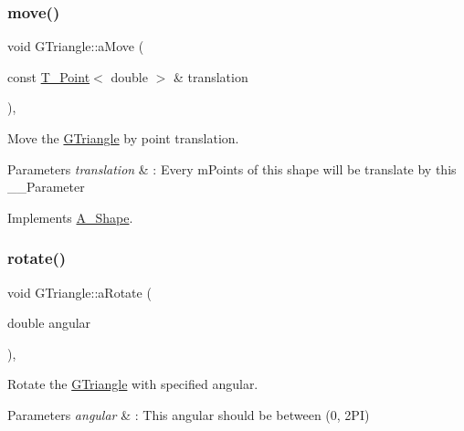 \mbox{\label{classGTriangle_a6675f3448fca16c1afec576145a9b139}} 
\subsubsection{\texorpdfstring{move()}{move()}}
{\footnotesize\ttfamily void G\+Triangle\+::aMove (\begin{DoxyParamCaption}\item[{const \hyperlink{classPoint}{T_Point}$<$ double $>$ \&}]{translation }\end{DoxyParamCaption})\hspace{0.3cm}{\ttfamily [override]}, {\ttfamily [virtual]}}



Move the \hyperlink{classGTriangle}{G\+Triangle} by point translation. 


\begin{DoxyParams}{Parameters}
{\em translation} & \+: Every mPoints of this shape will be translate by this __Parameter \\
\hline
\end{DoxyParams}


Implements \hyperlink{classShape_a1f447acd6219cb10b9b7a40371519c46}{A_Shape}.

\mbox{\label{classGTriangle_ae3ed75bbad4ba7fed68bc06c5834cfbe}} 
\subsubsection{\texorpdfstring{rotate()}{Rotate()}}
{\footnotesize\ttfamily void G\+Triangle\+::aRotate (\begin{DoxyParamCaption}\item[{double}]{angular }\end{DoxyParamCaption})\hspace{0.3cm}{\ttfamily [override]}, {\ttfamily [virtual]}}



Rotate the \hyperlink{classGTriangle}{G\+Triangle} with specified angular.


\begin{DoxyParams}{Parameters}
{\em angular} & \+: This angular should be between (0, 2\+PI) \\
\hline
\end{DoxyParams}


